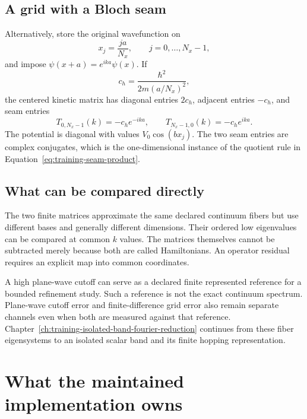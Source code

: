 \subsection{A grid with a Bloch seam}

Alternatively, store the original wavefunction on
\begin{equation}
  x_j=\frac{ja}{N_x},
  \qquad j=0,\ldots,N_x-1,
\end{equation}
and impose $\psi(x+a)=e^{ika}\psi(x)$. If
\begin{equation}
  c_h=\frac{\hbar^2}{2m(a/N_x)^2},
\end{equation}
the centered kinetic matrix has diagonal entries $2c_h$, adjacent entries
$-c_h$, and seam entries
\begin{equation}
  T_{0,N_x-1}(k)=-c_h e^{-ika},
  \qquad
  T_{N_x-1,0}(k)=-c_h e^{ika}.
  \label{eq:training-fd-one-dimensional-seam}
\end{equation}
The potential is diagonal with values $V_0\cos(bx_j)$. The two seam entries are
complex conjugates, which is the one-dimensional instance of the quotient rule
in Equation~\eqref{eq:training-seam-product}.

\subsection{What can be compared directly}

The two finite matrices approximate the same declared continuum fibers but use
different bases and generally different dimensions. Their ordered low
eigenvalues can be compared at common $k$ values. The matrices themselves
cannot be subtracted merely because both are called Hamiltonians. An operator
residual requires an explicit map into common coordinates.

A high plane-wave cutoff can serve as a declared finite represented reference
for a bounded refinement study. Such a reference is not the exact continuum
spectrum. Plane-wave cutoff error and finite-difference grid error also remain
separate channels even when both are measured against that reference.
Chapter~\ref{ch:training-isolated-band-fourier-reduction} continues from these
fiber eigensystems to an isolated scalar band and its finite hopping
representation.

\section{What the maintained implementation owns}

